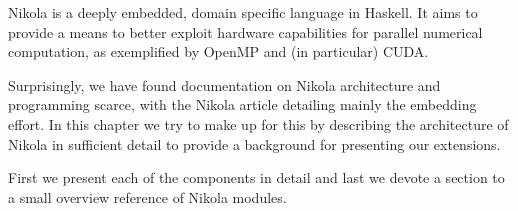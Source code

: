 
Nikola is a deeply embedded, domain specific language in Haskell. It aims to
provide a means to better exploit hardware capabilities for parallel numerical
computation, as exemplified by OpenMP and (in particular) CUDA.

Surprisingly, we have found documentation on Nikola architecture and
programming scarce, with the Nikola article \cite{mainland2010nikola}
detailing mainly the embedding effort. In this chapter we try to make up for
this by describing the architecture of Nikola in sufficient detail to provide a
background for presenting our extensions.

First we present each of the components in detail and last we devote a section
to a small overview reference of Nikola modules.
